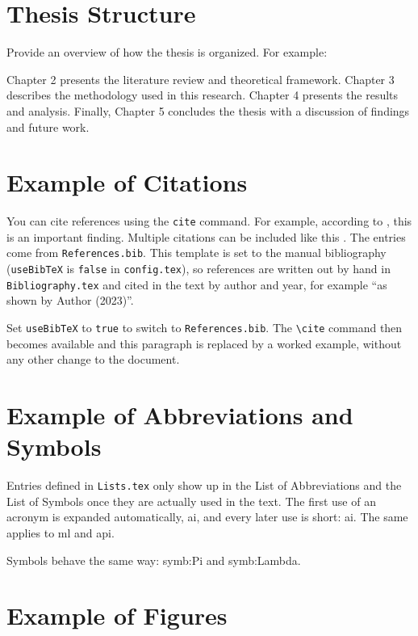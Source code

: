 \section{Thesis Structure}

Provide an overview of how the thesis is organized. For example:

Chapter 2 presents the literature review and theoretical framework. Chapter 3 describes the methodology used in this research. Chapter 4 presents the results and analysis. Finally, Chapter 5 concludes the thesis with a discussion of findings and future work.

\section{Example of Citations}

\ifusebibtex
You can cite references using the \texttt{cite} command. For example, according to
\cite{author2023}, this is an important finding. Multiple citations can be included
like this \cite{author2023, author2022}. The entries come from \texttt{References.bib}.
\else
This template is set to the manual bibliography (\texttt{useBibTeX} is \texttt{false}
in \texttt{config.tex}), so references are written out by hand in
\texttt{Bibliography.tex} and cited in the text by author and year, for example
``as shown by Author (2023)''.

Set \texttt{useBibTeX} to \texttt{true} to switch to \texttt{References.bib}. The
\texttt{\textbackslash cite} command then becomes available and this paragraph is
replaced by a worked example, without any other change to the document.
\fi

\section{Example of Abbreviations and Symbols}

Entries defined in \texttt{Lists.tex} only show up in the List of Abbreviations
and the List of Symbols once they are actually used in the text. The first use of
an acronym is expanded automatically, \gls{ai}, and every later use is short:
\gls{ai}. The same applies to \gls{ml} and \gls{api}.

Symbols behave the same way: \gls{symb:Pi} and \gls{symb:Lambda}.

\section{Example of Figures}

